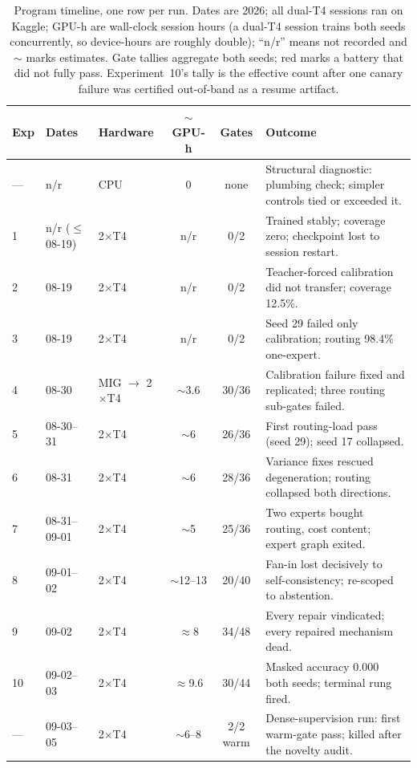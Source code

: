 \documentclass[10pt,a4paper]{article}
\newcommand{\fail}[1]{\textcolor{failred}{#1}}
\newcommand{\good}[1]{\textcolor{okgreen}{#1}}
\begin{document}
\begin{table}[htbp]
\caption{Program timeline, one row per run. Dates are 2026; all dual-T4
sessions ran on Kaggle; GPU-h are wall-clock session hours (a dual-T4 session
trains both seeds concurrently, so device-hours are roughly double); ``n/r''
means not recorded and $\sim$ marks estimates. Gate tallies aggregate both
seeds; \fail{red} marks a battery that did not fully pass. Experiment~10's
tally is the effective count after one canary failure was certified
out-of-band as a resume artifact.}
\label{tab:timeline}
\centering\footnotesize
\begin{tabularx}{\textwidth}{@{}lllccX@{}}
\toprule
\textbf{Exp} & \textbf{Dates} & \textbf{Hardware} & \textbf{$\sim$GPU-h} & \textbf{Gates} & \textbf{Outcome} \\
\midrule
--- & n/r & CPU & 0 & none & Structural diagnostic: plumbing check; simpler controls tied or exceeded it. \\
1 & n/r ($\le$08-19) & 2$\times$T4 & n/r & \fail{0/2} & Trained stably; coverage zero; checkpoint lost to session restart. \\
2 & 08-19 & 2$\times$T4 & n/r & \fail{0/2} & Teacher-forced calibration did not transfer; coverage 12.5\%. \\
3 & 08-19 & 2$\times$T4 & n/r & \fail{0/2} & Seed 29 failed only calibration; routing 98.4\% one-expert. \\
4 & 08-30 & MIG $\to$ 2$\times$T4 & $\sim$3.6 & \fail{30/36} & Calibration failure fixed and replicated; three routing sub-gates failed. \\
5 & 08-30--31 & 2$\times$T4 & $\sim$6 & \fail{26/36} & First routing-load pass (seed 29); seed 17 collapsed. \\
6 & 08-31 & 2$\times$T4 & $\sim$6 & \fail{28/36} & Variance fixes rescued degeneration; routing collapsed both directions. \\
7 & 08-31--09-01 & 2$\times$T4 & $\sim$5 & \fail{25/36} & Two experts bought routing, cost content; expert graph exited. \\
8 & 09-01--02 & 2$\times$T4 & $\sim$12--13 & \fail{20/40} & Fan-in lost decisively to self-consistency; re-scoped to abstention. \\
9 & 09-02 & 2$\times$T4 & $\approx$8 & \fail{34/48} & Every repair vindicated; every repaired mechanism dead. \\
10 & 09-02--03 & 2$\times$T4 & $\approx$9.6 & \fail{30/44} & Masked accuracy 0.000 both seeds; terminal rung fired. \\
--- & 09-03--05 & 2$\times$T4 & $\sim$6--8 & \good{2/2} warm & Dense-supervision run: first warm-gate pass; killed after the novelty audit. \\
\bottomrule
\end{tabularx}
\end{table}
\end{document}
